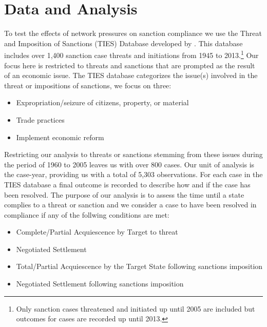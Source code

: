 \section*{Data and Analysis}
\label{empirics}

To test the effects of network pressures on sanction compliance we use the Threat and Imposition of Sanctions (TIES) Database developed by \citet{morgan2009threat}. This database includes over 1,400 sanction case threats and initiations from 1945 to 2013.\footnote{Only sanction cases threatened and initiated up until 2005 are included but outcomes for cases are recorded up until 2013.} Our focus here is restricted to threats and sanctions that are prompted as the result of an economic issue. The TIES database categorizes the issue(s) involved in the threat or impositions of sanctions, we focus on three:

\begin{singlespacing}
\begin{itemize}
	\item Expropriation/seizure of citizens, property, or material
	\item Trade practices
	\item Implement economic reform
\end{itemize}
\end{singlespacing}



Restricting our analysis to threats or sanctions stemming from these issues during the period of 1960 to 2005 leaves us with over 800 cases. Our unit of analysis is the case-year, providing us with a total of 5,303 observations. For each case in the TIES database a final outcome is recorded to describe how and if the case has been resolved. The purpose of our analysis is to assess the time until a state complies to a threat or sanction and we consider a case to have been resolved in compliance if any of the follwing conditions are met:

\begin{singlespacing}
\begin{itemize}
	\item Complete/Partial Acquiescence by Target to threat
	\item Negotiated Settlement
	\item Total/Partial Acquiescence by the Target State following sanctions imposition
	\item Negotiated Settlement following sanctions imposition
\end{itemize}
\end{singlespacing}
	
